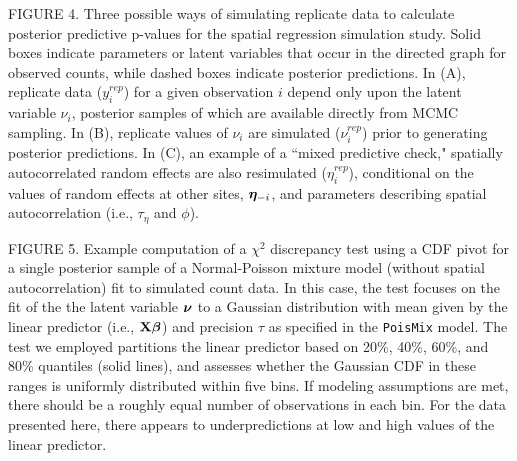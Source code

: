 \documentclass[12pt,english]{article}
\begin{document}
\begin{spacing}{1.9}
    FIGURE 4.  Three possible ways of simulating replicate data to
    calculate posterior predictive p-values for the spatial regression
    simulation study. Solid boxes indicate parameters or latent
    variables that occur in the directed graph for observed counts,
    while dashed boxes indicate posterior predictions.  In (A),
    replicate data ($y_i^{rep}$) for a given observation $i$ depend
    only upon the latent variable $\nu_i$, posterior samples of which
    are available directly from MCMC sampling.  In (B), replicate
    values of $\nu_i$ are simulated ($\nu_i^{rep}$) prior to
    generating posterior predictions.  In (C), an example of a ``mixed
    predictive check," spatially autocorrelated random effects are
    also resimulated ($\eta_i^{rep}$), conditional on the values of
    random effects at other sites, $\boldsymbol{\eta}_{-i}$, and parameters
    describing spatial autocorrelation (i.e., $\tau_\eta$ and $\phi$).

    FIGURE 5.  Example computation of a $\chi^2$ discrepancy test
    using a CDF pivot for a single posterior sample of a
    Normal-Poisson mixture model (without spatial autocorrelation) fit
    to simulated count data.  In this case, the test focuses on the
    fit of the the latent variable $\boldsymbol{\nu}$ to a Gaussian distribution
    with mean given by the linear predictor (i.e., ${\bf X}\boldsymbol{\beta}$) and
    precision $\tau$ as specified in the \texttt{PoisMix} model. The
    test we employed partitions the linear predictor based on 20\%,
    40\%, 60\%, and 80\% quantiles (solid lines), and assesses whether
    the Gaussian CDF in these ranges is uniformly distributed within
    five bins.  If modeling assumptions are met, there should be a
    roughly equal number of observations in each bin.  For the data
    presented here, there appears to underpredictions at low and high
    values of the linear predictor.


\end{spacing}
\end{document}
